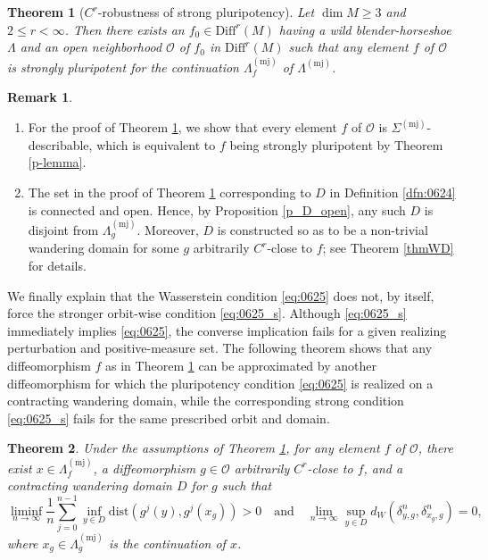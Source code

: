 \documentclass{amsart}
\newtheorem{mainresult}{Theorem}
\newtheorem{thm}{Theorem}[section]
\theoremstyle{definition}
\newtheorem{rmk}[thm]{Remark}
\numberwithin{equation}{section}
\numberwithin{figure}{section}
\begin{document}
\begin{mainresult}[$C^{r}$-robustness of strong pluripotency]\label{mainthm}
Let $\dim M\geq 3$ and $2\leq r<\infty$. 
Then 
there exists an $f_{0}\in \mathrm{Diff}^{r}(M)$ having a wild blender-horseshoe $\Lambda$ 
and an open neighborhood $\mathcal{O}$ of $f_0$ in $\mathrm{Diff}^{r}(M)$  
such that any element $f$ of $\mathcal{O}$ is strongly pluripotent for the continuation $\Lambda_{f}^{(\mathrm{mj})}$ of $\Lambda^{(\mathrm{mj})}$.
\end{mainresult}

\begin{rmk}\label{mainrmk}
\begin{enumerate}[$\bullet$]
\item For the proof of Theorem \ref{mainthm}, we show that every element $f$ of $\mathcal{O}$ is $\Sigma^{(\mathrm{mj})}$-describable, which is equivalent to $f$ being strongly pluripotent by Theorem \ref{p-lemma}.
\item The set in the proof of Theorem \ref{mainthm} corresponding to $D$ in Definition \ref{dfn:0624} is connected and open. 
Hence, by Proposition \ref{p_D_open}, any such $D$ is disjoint from $\Lambda_g^{(\mathrm{mj})}$. 
Moreover, $D$ is constructed so as to be a non-trivial wandering domain for some $g$ arbitrarily $C^{r}$-close to $f$; see Theorem \ref{thmWD} for details.
\end{enumerate}
\end{rmk}

We finally explain that the Wasserstein condition \eqref{eq:0625} does not, by itself, force the stronger orbit-wise condition \eqref{eq:0625_s}. 
Although \eqref{eq:0625_s} immediately implies \eqref{eq:0625}, the converse implication fails for a given realizing perturbation and positive-measure set. 
The following theorem shows that any diffeomorphism $f$ as in Theorem \ref{mainthm} can be approximated by another diffeomorphism for which the pluripotency condition \eqref{eq:0625} is realized on a contracting wandering domain, while the corresponding strong condition \eqref{eq:0625_s} fails for the same prescribed orbit and domain.

\begin{thm}\label{thm_new}
Under the assumptions of Theorem \ref{mainthm}, 
for any element $f$ of $\mathcal{O}$, there exist 
$x\in \Lambda_f^{(\mathrm{mj})}$, a diffeomorphism $g\in \mathcal{O}$ arbitrarily $C^r$-close to $f$, and a contracting wandering domain $D$ for $g$ such that
\[
\liminf_{n\rightarrow\infty}\frac1{n}\sum_{j=0}^{n-1}\inf_{y\in D}\mathrm{dist}(g^j(y),g^j(x_g))>0
\quad
\text{and}
\quad
\lim_{n\rightarrow\infty} \sup_{y\in D}d_W(\delta_{y,g}^n,\delta_{x_g,g}^n)=0,
\]
where $x_g\in \Lambda_g^{(\mathrm{mj})}$ is the continuation of $x$.
\end{thm}
\end{document}
